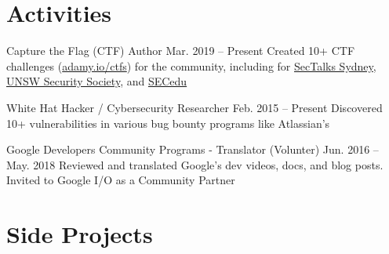 \documentclass[hidelinks__VERSION__]{adamyi-cv}
\begin{document}
\section{Activities}

\begin{entrylist}


\entry
{Capture the Flag (CTF) Author}
{Mar. 2019 -- Present}
{Created 10+ CTF challenges (\href{https://adamy.io/ctfs}{adamy.io/ctfs}) for the community, including for \href{https://www.sectalks.org/sydney/}{SecTalks Sydney}, \href{https://unswsecurity.com/}{UNSW Security Society}, and \href{https://sec.edu.au/}{SECedu}}


\entry
{White Hat Hacker / Cybersecurity Researcher}
{Feb. 2015 -- Present}
{Discovered 10+ vulnerabilities in various bug bounty programs like Atlassian's}


\entry
{Google Developers Community Programs - Translator (Volunter)}
{Jun. 2016 -- May. 2018}
{Reviewed and translated Google's dev videos, docs, and blog posts. Invited to Google I/O as a Community Partner}

\end{entrylist}


\section{Side Projects}
\end{document}
